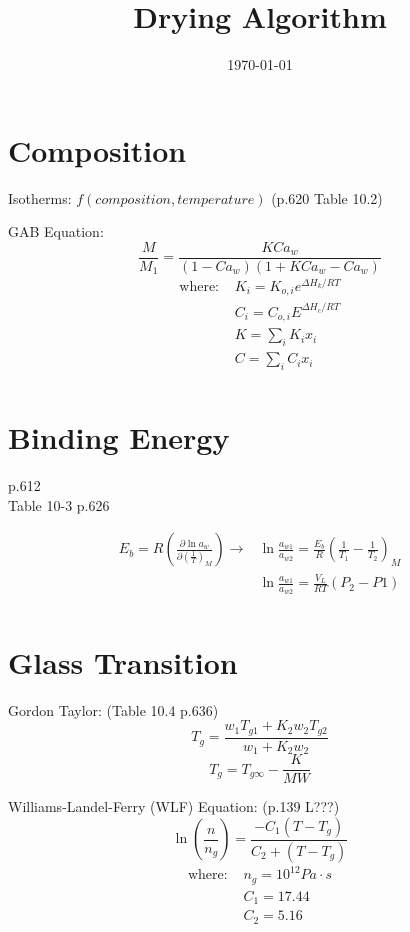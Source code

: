 \documentclass[11pt]{article}
\begin{document}
\title{Drying Algorithm}
\date{\today}
\maketitle

\section{Composition}
Isotherms: $f(composition, temperature)$ (p.620 Table 10.2)

GAB Equation:
\[ \frac{M}{M_1} = \frac{K C a_w}{(1-C a_w)(1 + K C a_w - C a_w)} \]
\begin{align*}
\text{where: }& K_i = K_{o,i} e^{\Delta H_k/RT}\\
&C_i = C_{o,i} E^{\Delta H_c/RT}\\
&K = \sum_i K_i x_i\\
&C = \sum_i C_i x_i\\
\end{align*}

\section{Binding Energy}
p.612\\
Table 10-3 p.626

\begin{align*}
E_b = R\left(\frac{\partial\ln a_w}{\partial\left(\frac{1}{T}\right)_M}\right) \rightarrow &\ln\frac{a_{w1}}{a_{w2}} = \frac{E_b}{R}\left(\frac{1}{T_1}-\frac{1}{T_2}\right)_M \\
& \ln\frac{a_{w1}}{a_{w2}} = \frac{V_L}{RT}(P_2-P1) \\
\end{align*}

\section{Glass Transition}
Gordon Taylor: (Table 10.4 p.636)
\[ T_g = \frac{w_1 T_{g1} + K_2 w_2 T_{g2}}{w_1 + K_2 w_2} \]
\[ T_g = T_{g\infty} - \frac{K}{MW} \]

Williams-Landel-Ferry (WLF) Equation: (p.139 L???)
\[ \ln\left(\frac{n}{n_g}\right) = \frac{-C_1 (T - T_g)}{C_2 + (T - T_g)} \]
\begin{align*}
\text{where: } &n_g = 10^{12} Pa \cdot s \\
& C_1 = 17.44\\
& C_2 = 5.16\\
\end{align*}
\end{document}
